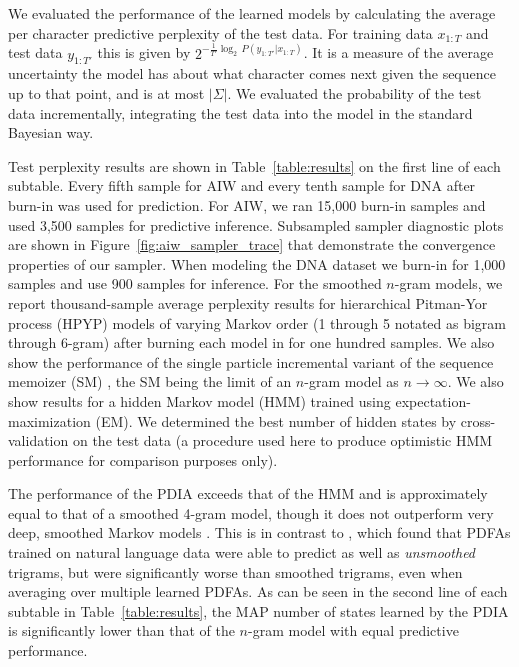We evaluated the performance of the learned models by calculating the average per character predictive perplexity of the test data.  For training data $x_{1:T}$ and test data $y_{1:T'}$ this is given by $2^{-\frac{1}{T'}\log_2\, P(y_{1:T'}|x_{1:T})}$.  It is a measure of the average uncertainty the model has about what character comes next given the sequence up to that point, and is at most $|\Sigma|$.  We evaluated the probability of the test data incrementally, integrating the test data into the model in the standard Bayesian way.  



Test perplexity results are shown in Table~\ref{table:results} on the first line of each subtable.  Every fifth sample for AIW and every tenth sample for DNA after burn-in was used for prediction.  For AIW, we ran 15,000 burn-in samples and used 3,500 samples for predictive inference.  Subsampled sampler diagnostic plots are shown in Figure~\ref{fig:aiw_sampler_trace} that demonstrate the convergence properties of our sampler.  When modeling the DNA dataset we burn-in for 1,000 samples and use 900 samples for inference.
For the smoothed $n$-gram models, we report thousand-sample average perplexity results for hierarchical Pitman-Yor process (HPYP) \cite{Teh2006a} models of varying Markov order (1 through 5 notated as bigram through 6-gram) after burning each model in for one hundred samples.  We also show the performance of the single particle incremental variant of the sequence memoizer (SM) \cite{Gasthaus2010}, the SM being the limit of an $n$-gram model as $n\rightarrow\infty$.
We also show results for a hidden Markov model (HMM) \cite{Murphy2005} trained using expectation-maximization (EM).  We determined the best number of hidden states by cross-validation on the test data (a procedure used here to produce optimistic HMM performance for comparison purposes only).  


The performance of the PDIA exceeds that of the HMM and is approximately equal to that of a smoothed 4-gram model, though it does not outperform very deep, smoothed Markov models .  This is in contrast to \cite{Thollard2001}, which found that PDFAs trained on natural language data were able to predict as well as {\em unsmoothed} trigrams, but were significantly worse than smoothed trigrams, even when averaging over multiple learned PDFAs.  As can be seen in the second line of each subtable in Table~\ref{table:results}, the MAP number of states learned by the PDIA is significantly lower than that of the $n$-gram model with equal predictive performance.

